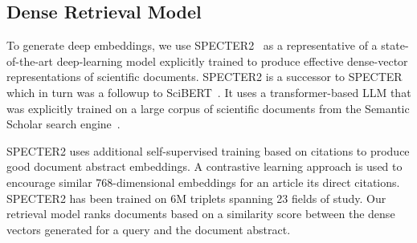 \documentclass[
]{ceurart}
\begin{document}
\subsection{Dense Retrieval Model}

To generate deep embeddings, we use SPECTER2~\cite{singh2023scirepeval} as a representative of a state-of-the-art deep-learning model explicitly trained to produce effective dense-vector representations of scientific documents.  SPECTER2 is a successor to SPECTER~\cite{specter} which in turn was a followup to SciBERT~\cite{scibert}.  It uses a transformer-based LLM that was explicitly trained on a large corpus of scientific documents from the Semantic Scholar search engine~\cite{semanticscholar}.

SPECTER2 uses additional self-supervised training based on citations to produce good document abstract embeddings. A contrastive learning approach is used to encourage similar 768-dimensional embeddings for an article its direct citations. SPECTER2 has been trained on 6M triplets spanning 23 fields of study. Our retrieval model ranks documents based on a similarity score between the dense vectors generated for a query and the document abstract. 
\end{document}
